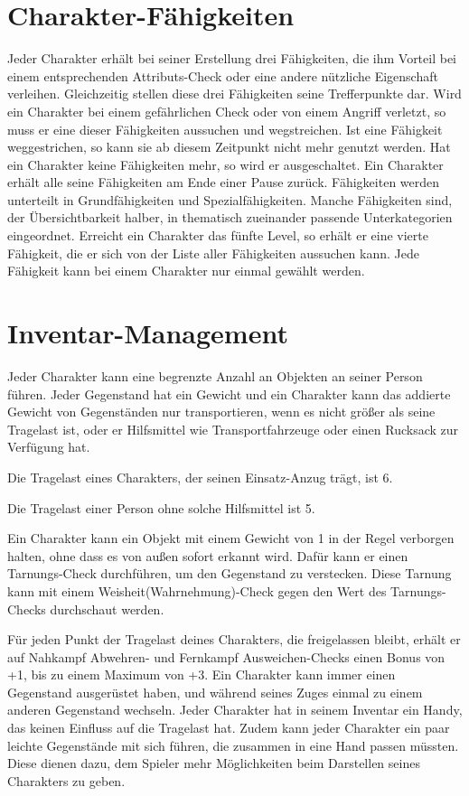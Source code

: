 \section{Charakter-Fähigkeiten}
Jeder Charakter erhält bei seiner Erstellung drei Fähigkeiten, die ihm Vorteil bei einem entsprechenden Attributs-Check oder eine andere nützliche Eigenschaft verleihen. Gleichzeitig stellen diese drei Fähigkeiten seine Trefferpunkte dar. Wird ein Charakter bei einem gefährlichen Check oder von einem Angriff verletzt, so muss er eine dieser Fähigkeiten aussuchen und wegstreichen. Ist eine Fähigkeit weggestrichen, so kann sie ab diesem Zeitpunkt nicht mehr genutzt werden. Hat ein Charakter keine Fähigkeiten mehr, so wird er ausgeschaltet. Ein Charakter erhält alle seine Fähigkeiten am Ende einer Pause zurück.
Fähigkeiten werden unterteilt in Grundfähigkeiten und Spezialfähigkeiten. Manche Fähigkeiten sind, der Übersichtbarkeit halber, in thematisch zueinander passende Unterkategorien eingeordnet.
Erreicht ein Charakter das fünfte Level, so erhält er eine vierte Fähigkeit, die er sich von der Liste aller Fähigkeiten aussuchen kann.
Jede Fähigkeit kann bei einem Charakter nur einmal gewählt werden.
\section{Inventar-Management}
Jeder Charakter kann eine begrenzte Anzahl an Objekten an seiner Person führen. Jeder Gegenstand hat ein Gewicht und ein Charakter kann das addierte Gewicht von Gegenständen nur transportieren, wenn es nicht größer als seine Tragelast ist, oder er Hilfsmittel wie Transportfahrzeuge oder einen Rucksack zur Verfügung hat.

Die Tragelast eines Charakters, der seinen Einsatz-Anzug trägt, ist 6.

Die Tragelast einer Person ohne solche Hilfsmittel ist 5.

Ein Charakter kann ein Objekt mit einem Gewicht von 1 in der Regel verborgen halten, ohne dass es von außen sofort erkannt wird. Dafür kann er einen Tarnungs-Check durchführen, um den Gegenstand zu verstecken. Diese Tarnung kann mit einem Weisheit(Wahrnehmung)-Check gegen den Wert des Tarnungs-Checks durchschaut werden.

Für jeden Punkt der Tragelast deines Charakters, die freigelassen bleibt, erhält er auf Nahkampf Abwehren- und Fernkampf Ausweichen-Checks einen Bonus von +1, bis zu einem Maximum von +3.
Ein Charakter kann immer einen Gegenstand ausgerüstet haben, und während seines Zuges einmal zu einem anderen Gegenstand wechseln.
Jeder Charakter hat in seinem Inventar ein Handy, das keinen Einfluss auf die Tragelast hat. Zudem kann jeder Charakter ein paar leichte Gegenstände mit sich führen, die zusammen in eine Hand passen müssten. Diese dienen dazu, dem Spieler mehr Möglichkeiten beim Darstellen seines Charakters zu geben.

